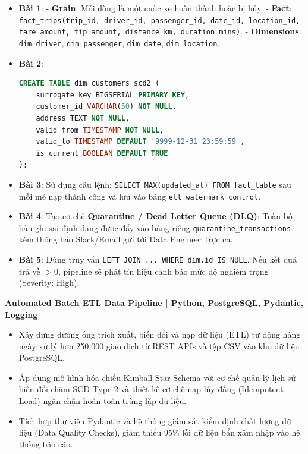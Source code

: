 \begin{dapanbox}
\begin{itemize}
    \item \textbf{Bài 1}: 
    - \textbf{Grain}: Mỗi dòng là một cuốc xe hoàn thành hoặc bị hủy.
    - \textbf{Fact}: \texttt{fact\_trips(trip\_id, driver\_id, passenger\_id, date\_id, location\_id, fare\_amount, tip\_amount, distance\_km, duration\_mins)}.
    - \textbf{Dimensions}: \texttt{dim\_driver}, \texttt{dim\_passenger}, \texttt{dim\_date}, \texttt{dim\_location}.
    \item \textbf{Bài 2}:
    \begin{lstlisting}[language=SQL]
CREATE TABLE dim_customers_scd2 (
    surrogate_key BIGSERIAL PRIMARY KEY,
    customer_id VARCHAR(50) NOT NULL,
    address TEXT NOT NULL,
    valid_from TIMESTAMP NOT NULL,
    valid_to TIMESTAMP DEFAULT '9999-12-31 23:59:59',
    is_current BOOLEAN DEFAULT TRUE
);
    \end{lstlisting}
    \item \textbf{Bài 3}: Sử dụng câu lệnh: \texttt{SELECT MAX(updated\_at) FROM fact\_table} sau mỗi mẻ nạp thành công và lưu vào bảng \texttt{etl\_watermark\_control}.
    \item \textbf{Bài 4}: Tạo cơ chế \textbf{Quarantine / Dead Letter Queue (DLQ)}: Toàn bộ bản ghi sai định dạng được đẩy vào bảng riêng \texttt{quarantine\_transactions} kèm thông báo Slack/Email gửi tới Data Engineer trực ca.
    \item \textbf{Bài 5}: Dùng truy vấn \texttt{LEFT JOIN ... WHERE dim.id IS NULL}. Nếu kết quả trả về $>0$, pipeline sẽ phát tín hiệu cảnh báo mức độ nghiêm trọng (Severity: High).
\end{itemize}
\end{dapanbox}

\begin{cvtipbox}
\textbf{Automated Batch ETL Data Pipeline | Python, PostgreSQL, Pydantic, Logging}
\begin{itemize}
    \item Xây dựng đường ống trích xuất, biến đổi và nạp dữ liệu (ETL) tự động hàng ngày xử lý hơn 250,000 giao dịch từ REST APIs và tệp CSV vào kho dữ liệu PostgreSQL.
    \item Áp dụng mô hình hóa chiều Kimball Star Schema với cơ chế quản lý lịch sử biến đổi chậm SCD Type 2 và thiết kế cơ chế nạp lũy đẳng (Idempotent Load) ngăn chặn hoàn toàn trùng lặp dữ liệu.
    \item Tích hợp thư viện Pydantic và hệ thống giám sát kiểm định chất lượng dữ liệu (Data Quality Checks), giảm thiểu 95\% lỗi dữ liệu bẩn xâm nhập vào hệ thống báo cáo.
\end{itemize}
\end{cvtipbox}
